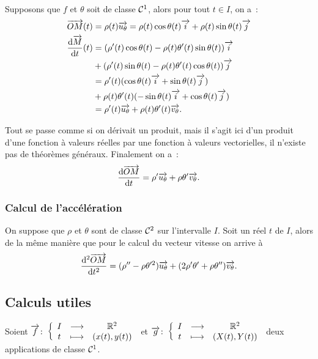 Supposons que \(f\) et \(\theta\) soit de classe \(\mathcal{C}^{1}\), alors pour tout 
\(t \in I\), on a~:
\begin{align}
  \overrightarrow{OM}(t)&=\rho(t) \overrightarrow{u_\theta}=\rho(t)\cos \theta(t) \overrightarrow{i} + \rho(t)\sin 
  \theta(t) \overrightarrow{j} \\
  \dfrac{\mathrm{d} \overrightarrow{M}}{\mathrm{d} t}(t)
              &=(\rho'(t) \cos \theta(t) - \rho(t) \theta'(t) \sin \theta(t)) 
              \overrightarrow{i} \\
              & + (\rho'(t) \sin \theta(t) - \rho(t) \theta'(t) \cos \theta(t)) 
              \overrightarrow{j} \notag\\
              &=\rho'(t) (\cos \theta(t) \overrightarrow{i} + \sin\theta(t) \overrightarrow{j}) \\
              & + \rho(t)\theta'(t)(-\sin\theta(t)\overrightarrow{i} + \cos\theta(t)\overrightarrow{j}) 
              \notag\\
              &=\rho'(t)\overrightarrow{u_\theta} + \rho(t)\theta'(t)\overrightarrow{v_\theta}.
\end{align}

Tout se passe comme si on dérivait un produit, mais il s'agit ici d'un produit 
d'une fonction à valeurs réelles par une fonction à valeurs vectorielles, il 
n'existe pas de théorèmes généraux. Finalement on a~:
\begin{equation}
  \dfrac{\mathrm{d} \overrightarrow{OM}}{\mathrm{d} t} = \rho' \overrightarrow{u_\theta} + \rho \theta' \overrightarrow{v_\theta}.
\end{equation}

\subsubsection{Calcul de l'accélération}

On suppose que \(\rho\) et \(\theta\) sont de classe \(\mathcal{C}^{2}\) sur 
l'intervalle \(I\). Soit un réel \(t\) de \(I\), alors de la même manière que 
pour le calcul du vecteur vitesse on arrive à
\begin{equation}
  \dfrac{\mathrm{d}^2 \overrightarrow{OM}}{\mathrm{d} {t}^2}=(\rho''-\rho\theta'^2)\overrightarrow{u_\theta} + 
  (2\rho'\theta'+\rho\theta'')\overrightarrow{v_\theta}.
\end{equation}

\subsection{Calculs utiles}

Soient \(\overrightarrow{f}\colon \left\{\begin{array}{ccc} I & \longrightarrow &\mathbb{R}^2\\ t & \longmapsto & (x(t),y(t)) \end{array} \right.\) et 
\(\overrightarrow{g}\colon \left\{\begin{array}{ccc} I & \longrightarrow &\mathbb{R}^2\\ t & \longmapsto & (X(t),Y(t)) \end{array} \right.\) deux applications de classe 
\(\mathcal{C}^{1}\).

